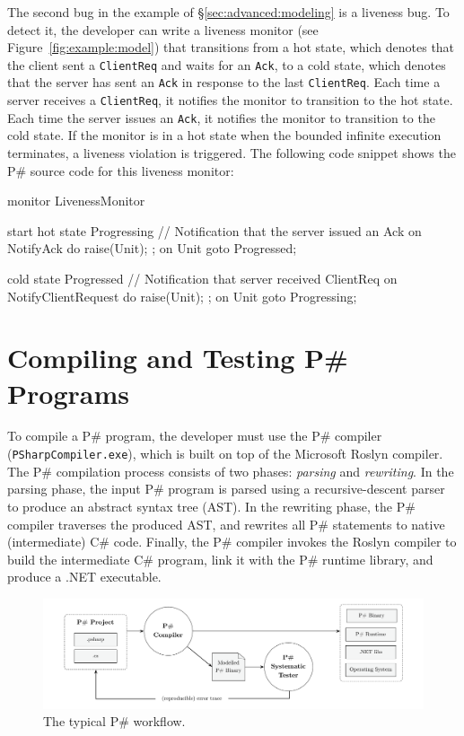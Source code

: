 \documentclass{llncs}
\newcommand{\ps}{P\#\xspace}
\newcommand{\cs}{C\#\xspace}
\begin{document}
The second bug in the example of \S\ref{sec:advanced:modeling} is a liveness bug. To detect it, the developer can write a liveness monitor (see Figure~\ref{fig:example:model}) that transitions from a hot state, which denotes that the client sent a \texttt{ClientReq} and waits for an \texttt{Ack}, to a cold state, which denotes that the server has sent an \texttt{Ack} in response to the last \texttt{ClientReq}. Each time a server receives a \texttt{ClientReq}, it notifies the monitor to transition to the hot state. Each time the server issues an \texttt{Ack}, it notifies the monitor to transition to the cold state. If the monitor is in a hot state when the bounded infinite execution terminates, a liveness violation is triggered. The following code snippet shows the \ps source code for this liveness monitor:

\begin{psharp}
monitor LivenessMonitor {
  start hot state Progressing {
    // Notification that the server issued an Ack
    on NotifyAck do {
      raise(Unit);
    };
    on Unit goto Progressed;
  }
  
  cold state Progressed {
    // Notification that server received ClientReq
    on NotifyClientRequest do {
      raise(Unit);
    };
    on Unit goto Progressing;
  }
}
\end{psharp}

\section{Compiling and Testing \ps Programs}
\label{sec:compilation}

To compile a \ps program, the developer must use the \ps compiler (\texttt{PSharpCompiler.exe}), which is built on top of the Microsoft Roslyn compiler. The \ps compilation process consists of two phases: \emph{parsing} and \emph{rewriting}. In the parsing phase, the input \ps program is parsed using a recursive-descent parser to produce an abstract syntax tree (AST). In the rewriting phase, the \ps compiler traverses the produced AST, and rewrites all \ps statements to native (intermediate) \cs code. Finally, the \ps compiler invokes the Roslyn compiler to build the intermediate \cs program, link it with the \ps runtime library, and produce a .NET executable.

\begin{figure}[t]
\centering
\includegraphics[width=0.95\linewidth]{figures/workflow.pdf}
\caption{The typical \ps workflow.}
\label{fig:workflow}
\end{figure}
\end{document}
